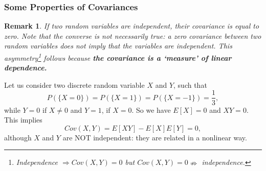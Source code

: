 \documentclass[notes=show,handout]{beamer}
\newtheorem{remark}{Remark}[section]
\begin{document}
\begin{frame}%

\frametitle{Some Properties of Covariances}
\begin{small}
\begin{remark} 
 If two random variables are independent, their covariance is equal to
zero. Note that the converse is not necessarily true: a zero covariance
between two random variables does not imply that the variables are 
independent. This asymmetry\footnote{Independence $\Rightarrow Cov(X,Y)=0$ but $Cov(X,Y)=0\nRightarrow$ independence.} follows because \textbf{the covariance is  a `measure' of linear dependence.}
\end{remark}
\begin{example}

Let us consider two discrete random variable $X$ and $Y$, such that
$$
P(\{X=0\})=P(\{X=1\})=P(\{X=-1\})=\frac{1}{3},
$$
while $Y=0$ if $X\neq 0$ and $Y=1$, if $X=0$. So we have $E[X]=0$ and $XY=0$. This implies
$$
Cov(X,Y) = E[XY] -E[X]E[Y] =0,
$$ 
although $X$ and $Y$ are NOT independent: they are related in a nonlinear way. 

\end{example}
\end{small}

\end{frame}
\end{document}
